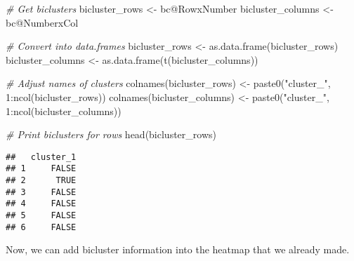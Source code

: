 \documentclass[
  oneside]{book}
\newenvironment{Shaded}{\begin{snugshade}}{\end{snugshade}}
\newcommand{\CommentTok}[1]{\textcolor[rgb]{0.56,0.35,0.01}{\textit{#1}}}
\newcommand{\DecValTok}[1]{\textcolor[rgb]{0.00,0.00,0.81}{#1}}
\newcommand{\FunctionTok}[1]{\textcolor[rgb]{0.00,0.00,0.00}{#1}}
\newcommand{\NormalTok}[1]{#1}
\newcommand{\OtherTok}[1]{\textcolor[rgb]{0.56,0.35,0.01}{#1}}
\newcommand{\SpecialCharTok}[1]{\textcolor[rgb]{0.00,0.00,0.00}{#1}}
\newcommand{\StringTok}[1]{\textcolor[rgb]{0.31,0.60,0.02}{#1}}
\begin{document}
\begin{Shaded}
\begin{Highlighting}[]
\CommentTok{\# Get biclusters}
\NormalTok{bicluster\_rows }\OtherTok{\textless{}{-}}\NormalTok{ bc}\SpecialCharTok{@}\NormalTok{RowxNumber}
\NormalTok{bicluster\_columns }\OtherTok{\textless{}{-}}\NormalTok{ bc}\SpecialCharTok{@}\NormalTok{NumberxCol}

\CommentTok{\# Convert into data.frames}
\NormalTok{bicluster\_rows }\OtherTok{\textless{}{-}} \FunctionTok{as.data.frame}\NormalTok{(bicluster\_rows)}
\NormalTok{bicluster\_columns }\OtherTok{\textless{}{-}} \FunctionTok{as.data.frame}\NormalTok{(}\FunctionTok{t}\NormalTok{(bicluster\_columns))}

\CommentTok{\# Adjust names of clusters}
\FunctionTok{colnames}\NormalTok{(bicluster\_rows) }\OtherTok{\textless{}{-}} \FunctionTok{paste0}\NormalTok{(}\StringTok{"cluster\_"}\NormalTok{, }\DecValTok{1}\SpecialCharTok{:}\FunctionTok{ncol}\NormalTok{(bicluster\_rows))}
\FunctionTok{colnames}\NormalTok{(bicluster\_columns) }\OtherTok{\textless{}{-}} \FunctionTok{paste0}\NormalTok{(}\StringTok{"cluster\_"}\NormalTok{, }\DecValTok{1}\SpecialCharTok{:}\FunctionTok{ncol}\NormalTok{(bicluster\_columns))}

\CommentTok{\# Print biclusters for rows}
\FunctionTok{head}\NormalTok{(bicluster\_rows)}
\end{Highlighting}
\end{Shaded}

\begin{verbatim}
##   cluster_1
## 1     FALSE
## 2      TRUE
## 3     FALSE
## 4     FALSE
## 5     FALSE
## 6     FALSE
\end{verbatim}

Now, we can add bicluster information into the heatmap that we already made.
\end{document}
